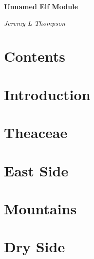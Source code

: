 \documentclass[oneside]{book}
\begin{document}
\begin{titlepage}
\centering

{\Huge\bfseries\color{firebrick} Unnamed Elf Module\par}
\vspace{2cm}
{\large\itshape Jeremy L Thompson}

\end{titlepage}

\chapter*{Contents}

\begin{multicols}{2}
\makeatletter
\large{
}
\makeatother
\end{multicols}

\chapter*{Introduction}



\chapter{Theaceae}



\chapter{East Side}



\chapter{Mountains}



\chapter{Dry Side}


\end{document}
